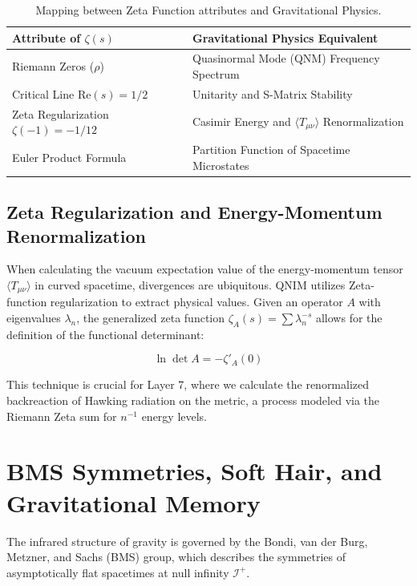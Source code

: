 \documentclass[11pt,a4paper,spanish]{book}
\numberwithin{equation}{chapter}
\numberwithin{figure}{chapter}
\numberwithin{equation}{chapter}
\numberwithin{figure}{chapter}
\numberwithin{table}{chapter}
\begin{document}
\begin{table}[h]
\centering
\caption{Mapping between Zeta Function attributes and Gravitational Physics.}
\label{tab:zeta_gravity}
\begin{tabular}{@{}ll@{}}
\toprule
\textbf{Attribute of $\zeta(s)$} & \textbf{Gravitational Physics Equivalent} \\ \midrule
Riemann Zeros ($\rho$) & Quasinormal Mode (QNM) Frequency Spectrum \\
Critical Line $\text{Re}(s) = 1/2$ & Unitarity and S-Matrix Stability \\
Zeta Regularization $\zeta(-1) = -1/12$ & Casimir Energy and $\langle T_{\mu\nu} \rangle$ Renormalization \\
Euler Product Formula & Partition Function of Spacetime Microstates \\ \bottomrule
\end{tabular}
\end{table}

\subsection{Zeta Regularization and Energy-Momentum Renormalization}

When calculating the vacuum expectation value of the energy-momentum tensor $\langle T_{\mu\nu} \rangle$ in curved spacetime, divergences are ubiquitous. QNIM utilizes Zeta-function regularization to extract physical values. Given an operator $A$ with eigenvalues $\lambda_n$, the generalized zeta function $\zeta_A(s) = \sum \lambda_n^{-s}$ allows for the definition of the functional determinant:

\begin{equation}
\ln \det A = -\zeta'_A(0)
\end{equation}

This technique is crucial for Layer 7, where we calculate the renormalized backreaction of Hawking radiation on the metric, a process modeled via the Riemann Zeta sum for $n^{-1}$ energy levels.

\section{BMS Symmetries, Soft Hair, and Gravitational Memory}

The infrared structure of gravity is governed by the Bondi, van der Burg, Metzner, and Sachs (BMS) group, which describes the symmetries of asymptotically flat spacetimes at null infinity $\mathcal{I}^+$.
\end{document}
